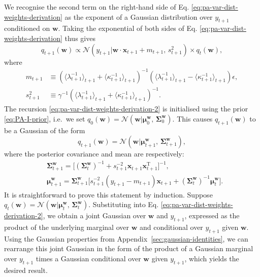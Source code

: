 We recognise the second term on the right-hand side of Eq. \eqref{eq:pa-var-dist-weights-derivation} as the exponent of a Gaussian distribution over $y_{t+1}$ conditioned on $\mathbf{w}$. Taking the exponential of both sides of Eq. \eqref{eq:pa-var-dist-weights-derivation} thus gives
\begin{equation}
\label{eq:pa-var-dist-weights-derivation-2}
	q_{t+1}(\mathbf{w})
	\propto \mathcal{N}(y_{t+1}|\mathbf{w}\cdot\mathbf{x}_{t+1} + m_{t+1},\, s_{t+1}^2)
	\times q_{t}(\mathbf{w}),
\end{equation}
where
\begin{align}
	m_{t+1}
	&\equiv (\langle\lambda_{t+1}^{-1}\rangle_{t+1} + \langle\kappa_{t+1}^{-1}\rangle_{t+1})^{-1}(\langle\lambda_{t+1}^{-1}\rangle_{t+1} - \langle\kappa_{t+1}^{-1}\rangle_{t+1})\epsilon,
	\\
	s_{t+1}^2
	&\equiv \gamma^{-1}(\langle\lambda_{t+1}^{-1}\rangle_{t+1} + \langle\kappa_{t+1}^{-1}\rangle_{t+1})^{-1}.
\end{align}
The recursion \eqref{eq:pa-var-dist-weights-derivation-2} is initialised using the prior \eqref{eq:PA-I-prior}, i.e.\ we set $
	q_{0}(\mathbf{w})
	= \mathcal{N}(\mathbf{w}|\boldsymbol{\mu}_{0}^\mathbf{w},\, \boldsymbol{\Sigma}_{0}^\mathbf{w})
$. This causes $q_{t+1}(\mathbf{w})$ to be a Gaussian of the form
\begin{equation}
	q_{t+1}(\mathbf{w})
	= \mathcal{N}(\mathbf{w}|\boldsymbol{\mu}_{t+1}^\mathbf{w},\, \boldsymbol{\Sigma}_{t+1}^\mathbf{w}),
\end{equation}
where the posterior covariance and mean are respectively:
\begin{align}
	& \boldsymbol{\Sigma}_{t+1}^\mathbf{w}
	= \big[(\boldsymbol{\Sigma}_{t}^\mathbf{w})^{-1} + s_{t+1}^{-2}\mathbf{x}_{t+1}\mathbf{x}_{t+1}^\text{T}\big]^{-1},
	\label{eq:variational-weight-covariance} \\
	& \boldsymbol{\mu}_{t+1}^\mathbf{w}
	= \boldsymbol{\Sigma}_{t+1}^\mathbf{w}\big[s_{t+1}^{-2}(y_{t+1} - m_{t+1})\mathbf{x}_{t+1} + (\boldsymbol{\Sigma}_{t}^\mathbf{w})^{-1}\boldsymbol{\mu}_{t}^\mathbf{w}\big].
	\label{eq:variational-weight-mean}
\end{align}
It is straightforward to prove this statement by induction. Suppose $
	q_{t}(\mathbf{w})
	= \mathcal{N}(\mathbf{w}|\boldsymbol{\mu}_{t}^\mathbf{w},\, \boldsymbol{\Sigma}_{t}^\mathbf{w})
$. Substituting into Eq. \eqref{eq:pa-var-dist-weights-derivation-2}, we obtain a joint Gaussian over $\mathbf{w}$ and $y_{t+1}$, expressed as the product of the underlying marginal over $\mathbf{w}$ and conditional over $y_{t+1}$ given $\mathbf{w}$. Using the Gaussian properties from Appendix~\ref{sec:gaussian-identities}, we can rearrange this joint Gaussian in the form of the product of a Gaussian marginal over $y_{t+1}$ times a Gaussian conditional over $\mathbf{w}$ given $y_{t+1}$, which yields the desired result.

